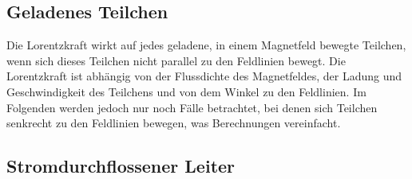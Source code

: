 




%
%	





\subsection{Geladenes Teilchen}

Die Lorentzkraft wirkt auf jedes geladene, in einem Magnetfeld bewegte Teilchen, wenn sich dieses Teilchen nicht parallel zu den Feldlinien bewegt. Die Lorentzkraft ist abhängig von der Flussdichte des Magnetfeldes, der Ladung und Geschwindigkeit des Teilchens und von dem Winkel zu den Feldlinien. Im Folgenden werden jedoch nur noch Fälle betrachtet, bei denen sich Teilchen senkrecht zu den Feldlinien bewegen, was Berechnungen vereinfacht.


\subsection{Stromdurchflossener Leiter}

